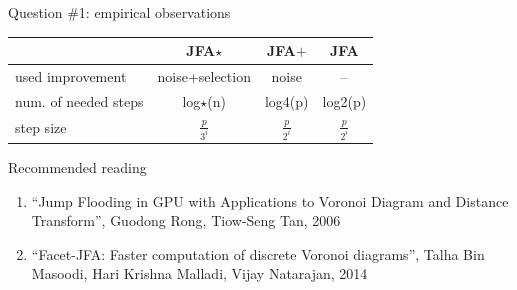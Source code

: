 \documentclass[aspectratio=169, 22pt]{beamer}
\begin{document}
\begin{frame}{Question \#1: empirical observations}


\Large
\centering
\begin{tabular}{ l|c|c|c }

			 &  JFA$\star$        &  JFA$+$    &    JFA         \\ \hline
	used improvement      & noise+selection &    noise   &        --        \\
	num. of needed steps  &  log$\star$(n)  &    log4(p)  &     log2(p)      \\
	step size &  $\frac{p}{3^i}$ &  $\frac{p}{2^i}$ & $\frac{p}{2^i}$  \\

\end{tabular}

\end{frame}


\begin{frame}{Recommended reading}

\begin{enumerate}
\item ``Jump Flooding in GPU with Applications to Voronoi Diagram and Distance
	Transform'', Guodong Rong, Tiow-Seng Tan, 2006
\item ``Facet-JFA: Faster computation of discrete Voronoi diagrams'', Talha Bin
	Masoodi, Hari Krishna Malladi, Vijay Natarajan, 2014
\end{enumerate}

\end{frame}
\end{document}
